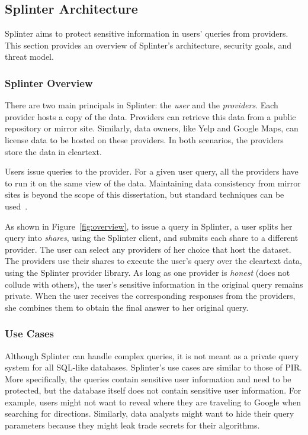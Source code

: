 \subsection{Splinter Architecture}
\label{sec:goals}

Splinter aims to protect sensitive information in users' queries
from providers. This section provides an overview of Splinter's architecture,
security goals, and threat model.

\subsubsection{Splinter Overview}
\label{sec:model}
There are two main principals in Splinter: the \emph{user} and the \emph{providers}.
Each provider hosts a copy of the data. Providers can 
retrieve this data from a public repository or mirror site.
Similarly, data owners, like Yelp and Google Maps, can license
data to be hosted on these providers. In both scenarios,
the providers store the data in cleartext. 

Users issue queries to the provider.
For a given user query, all the providers have to run it on the same
view of the data. Maintaining data consistency
from mirror sites is beyond the scope of this dissertation, but
standard techniques can be used~\cite{tewari2002wcdp,chi2008novel}.

As shown in Figure~\ref{fig:overview}, 
to issue a query in Splinter, a user
splits her query into \textit{shares}, using the Splinter client,
and submits each share to a different provider.
The user can select any providers of her choice that host the dataset.
The providers use their shares to execute the user's query 
over the cleartext data, using the Splinter provider library. 
As long as one provider is \textit{honest}
(does not collude with others), the user's sensitive information in the original query
remains private. When the user receives the corresponding responses from the providers,
she combines them to obtain the final answer to her original query. 

\subsubsection{Use Cases}
\label{sec:splinter_cases}
Although Splinter can handle complex queries, it is not
meant as a private query system for all SQL-like databases.
Splinter's use cases are similar to those of PIR. More specifically,
the queries contain sensitive user information and need to be 
protected, but the database itself does not contain
sensitive user information. For example, users might not
want to reveal where they are traveling to Google when searching
for directions. Similarly, data analysts might want to hide
their query parameters because they might leak trade
secrets for their algorithms.

